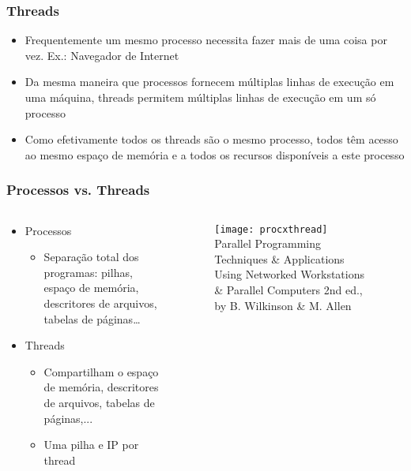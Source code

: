 \documentclass[Ligatures=TeX,table,brazil,svgnames,usetotalslideindicator,compress,10pt]{beamer}
\begin{document}
\begin{frame}
  \frametitle{Threads}
  \begin{itemize}
  \item Frequentemente um mesmo processo necessita fazer \alert{mais
      de uma coisa por vez}. Ex.: Navegador de Internet
  \item Da mesma maneira que processos fornecem múltiplas linhas de
    execução em uma máquina, threads permitem \alert{múltiplas linhas
      de execução em um só processo}
  \item Como efetivamente todos os threads são o mesmo processo,
    \alert{todos têm acesso ao mesmo espaço de memória} e a todos os
    recursos disponíveis a este processo
  \end{itemize}
\end{frame}


\begin{frame}
  \frametitle{Processos vs. Threads}

  \begin{columns}
    \begin{column}{0.5\textwidth}
      \begin{itemize}
      \item \alert{Processos}
        \begin{itemize}
        \item Separação total dos programas: pilhas, espaço de
          memória, descritores de arquivos, tabelas de páginas…
        \end{itemize}
      \item \alert{Threads}
        \begin{itemize}
        \item Compartilham o espaço de memória, descritores de arquivos, tabelas de páginas,...
        \item Uma pilha e IP por thread
        \end{itemize}
      \end{itemize}
    \end{column}
    \begin{column}{0.5\textwidth}
      \begin{figure}
        \centering
        \texttt{[image: procxthread]} \\
        \tiny{Parallel Programming Techniques \& Applications Using Networked
Workstations \& Parallel Computers 2nd ed., by B. Wilkinson \& M. Allen}
      \end{figure}
     \end{column}
  \end{columns}
\end{frame}
\end{document}
